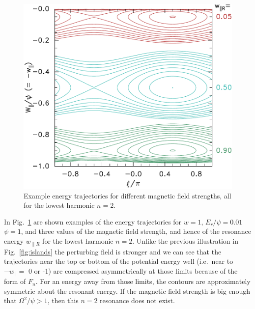 \documentclass{agujournal2019}
\def\wp{w_\parallel}
\def\wr{w_{\parallel R}}
\begin{document}
\begin{figure}%
  \centering
  \includegraphics[width=0.6\hsize]{cont559}
  \caption{Example energy trajectories for different magnetic field strengths,
  all for the lowest harmonic $n=2$.}
  \label{fig:entraj}
\end{figure}
In Fig.\ \ref{fig:entraj} are shown examples of the energy
trajectories for $w=1$, $E_r/\psi=0.01$ $\psi=1$, and three values of the
magnetic field strength, and hence of the resonance energy $\wr $ for
the lowest harmonic $n=2$.  Unlike the previous illustration in Fig.\
\ref{fig:islands} the perturbing field is stronger and we can see
that the trajectories near the top or bottom of the potential energy
well (i.e.\ near to $-\wp =$ 0 or -1) are compressed asymmetrically at
those limits because of the form of $F_n$. For an energy away from
those limits, the contours are approximately symmetric about the
resonant energy. If the magnetic field strength is big enough that
$\Omega^2/\psi >1$, then this $n=2$ resonance does not exist.
\end{document}
